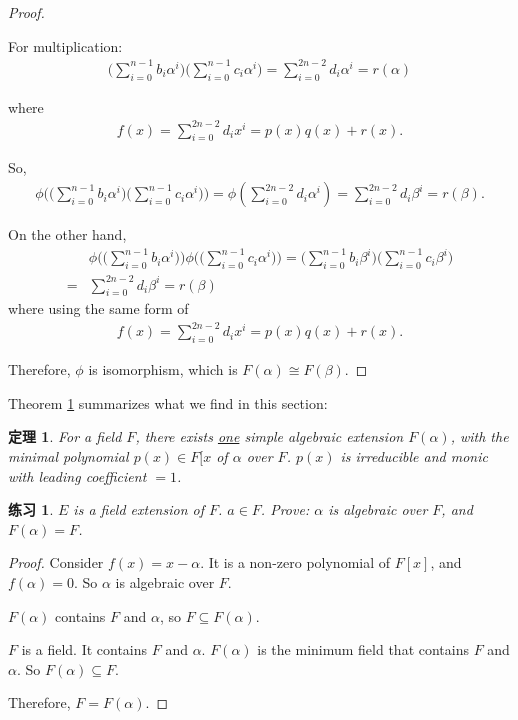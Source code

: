 \documentclass[utf8]{ctexbook}
\newtheorem{theorem}{定理}[section]
\newtheorem{exercise}{练习}[section]
\begin{document}
\begin{proof}
\begin{itemize}
{For multiplication:
\begin{align*}
\Big(\sum_{i=0}^{n-1} b_i \alpha^i \Big) \Big( \sum_{i=0}^{n-1} c_i \alpha^i \Big) = \sum_{i=0} ^{2n-2} d_i \alpha^i = r(\alpha)
\end{align*}

where
\begin{align*}
f(x) = \sum_{i=0} ^{2n-2} d_i x^i = p(x) q(x) +  r(x) .
\end{align*}

So,
\begin{align*}
\phi\bigg( \Big(\sum_{i=0}^{n-1} b_i \alpha^i \Big) \Big( \sum_{i=0}^{n-1} c_i \alpha^i \Big) \bigg) = \phi(\sum_{i=0} ^{2n-2} d_i \alpha^i) = \sum_{i=0} ^{2n-2} d_i \beta^i = r(\beta) .
\end{align*}

On the other hand,
\begin{align*}
& \phi\bigg( \Big(\sum_{i=0}^{n-1} b_i \alpha^i \Big) \bigg) \phi \bigg( \Big( \sum_{i=0}^{n-1} c_i \alpha^i \Big) \bigg) = \Big(\sum_{i=0}^{n-1} b_i \beta^i \Big) \Big( \sum_{i=0}^{n-1} c_i \beta^i \Big) \\
= & \sum_{i=0} ^{2n-2} d_i \beta^i = r(\beta)
\end{align*}
where using the same form of
\begin{align*}
f(x) = \sum_{i=0} ^{2n-2} d_i x^i = p(x) q(x) +  r(x) .
\end{align*}
}
\end{itemize}

Therefore, $\phi$ is isomorphism, which is $F(\alpha) \cong F(\beta)$.

\end{proof}


Theorem \ref{theorem_4_2_unique_iso_simple_alge_extension} summarizes what we find in this section:

\begin{theorem}
\label{theorem_4_2_unique_iso_simple_alge_extension}
For a field $F$, there exists \underline{one} simple algebraic extension $F(\alpha)$, with the minimal polynomial $p(x)\in F[x$ of $\alpha$ over $F$. $p(x)$ is irreducible and monic with leading coefficient $=1$.  
\end{theorem}

\begin{exercise}
$E$ is a field extension of $F$. $a \in F$. Prove: $\alpha$ is algebraic over $F$, and $F(\alpha) = F$.
\end{exercise}

\begin{proof}
Consider $f(x) = x - \alpha$. It is a non-zero polynomial of $F[x]$, and $f(\alpha) = 0$. So $\alpha$ is algebraic over $F$.

$F(\alpha)$ contains $F$ and $\alpha$, so $F \subseteq F(\alpha)$.

$F$ is a field. It contains $F$ and $\alpha$. $F(\alpha)$ is the minimum field that contains $F$ and $\alpha$. So $F(\alpha) \subseteq F$.

Therefore, $F = F(\alpha)$.
\end{proof}
\end{document}
